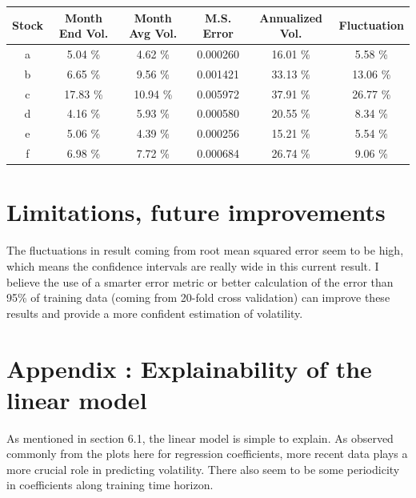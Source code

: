 \documentclass{article}
\begin{document}
\begin{center}
	\def\arraystretch{1.5}
	\begin{tabular}{| c | c | c | c | c | c |}
		\hline
		Stock & Month End Vol. & Month Avg Vol. & M.S. Error & Annualized Vol. & Fluctuation \\ \hline
		a     & 5.04 \%        & 4.62 \%        & 0.000260   & 16.01 \%        & 5.58 \%     \\
		b     & 6.65 \%        & 9.56 \%        & 0.001421   & 33.13 \%        & 13.06 \%    \\
		c     & 17.83 \%       & 10.94 \%       & 0.005972   & 37.91 \%        & 26.77 \%    \\
		d     & 4.16 \%        & 5.93 \%        & 0.000580   & 20.55 \%        & 8.34 \%     \\
		e     & 5.06 \%        & 4.39 \%        & 0.000256   & 15.21 \%        & 5.54 \%     \\
		f     & 6.98 \%        & 7.72  \%       & 0.000684   & 26.74 \%        & 9.06 \%     \\ \hline
	\end{tabular}
\end{center}	

\section{Limitations, future improvements}
 The fluctuations in result coming from root mean squared error seem to be high, which means the confidence intervals are really wide in this current result. I believe the use of a smarter error metric or better calculation of the error than 95\% of training data (coming from 20-fold cross validation) can improve these results and provide a more confident estimation of volatility.



\pagebreak

\section{Appendix : Explainability of the linear model}

As mentioned in section 6.1, the linear model is simple to explain. As observed commonly from the plots here for regression coefficients, more recent data plays a more crucial role in predicting volatility. There also seem to be some periodicity in coefficients along training time horizon.
\end{document}
